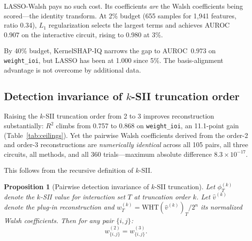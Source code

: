 \documentclass[11pt]{article}
\newtheorem{proposition}{Proposition}
\begin{document}
LASSO-Walsh pays no such cost. Its coefficients \emph{are} the Walsh
coefficients being scored---the identity transform. At 2\% budget
(655 samples for 1{,}941 features, ratio 0.34), $L_1$ regularization
selects the largest terms and achieves AUROC~$0.907$ on the
interactive circuit, rising to 0.980 at 3\%.

By 40\% budget, KernelSHAP-IQ narrows the gap to AUROC~$0.973$
on \texttt{weight\_ioi}, but LASSO has been at 1.000 since 5\%.
The basis-alignment advantage is not overcome by additional data.


\subsection{Detection invariance of $k$-SII truncation order}
\label{sec:invariance}

Raising the $k$-SII truncation order from 2 to 3 improves
reconstruction substantially: $R^2$ climbs from 0.757 to 0.868 on
\texttt{weight\_ioi}, an 11.1-point gain (Table~\ref{tab:ceilings}).
Yet the pairwise Walsh coefficients derived from the order-2 and
order-3 reconstructions are \emph{numerically identical} across all
105 pairs, all three circuits, all methods, and all 360
trials---maximum absolute difference $8.3 \times 10^{-17}$.

This follows from the recursive definition of $k$-SII.

\begin{proposition}[Pairwise detection invariance of $k$-SII truncation]
\label{prop:invariance}
Let $\phi^{(k)}_T$ denote the $k$-SII value for interaction set $T$
at truncation order $k$. Let $\hat{v}^{(k)}$ denote the plug-in
reconstruction and $w^{(k)}_T = \text{WHT}(\hat{v}^{(k)})_T / 2^n$
its normalized Walsh coefficients. Then for any pair $\{i,j\}$:
\[
  w^{(2)}_{\{i,j\}} = w^{(3)}_{\{i,j\}}.
\]
\end{proposition}
\end{document}
